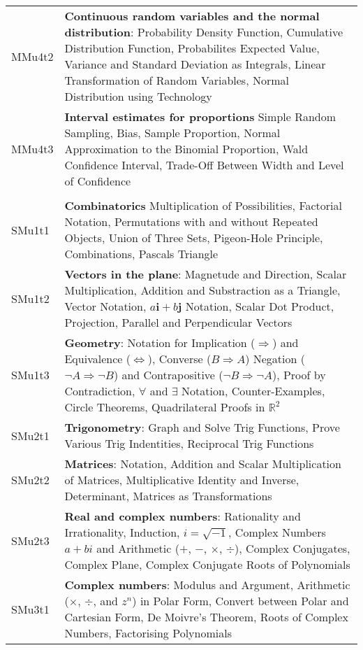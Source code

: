 \documentclass[varwidth=144mm, 12pt]{standalone}
\begin{document}
\begin{longtable}{lp{}}
MMu4t2 & \textbf{Continuous random variables and the normal distribution}: Probability Density Function, Cumulative Distribution Function, Probabilites Expected Value, Variance and Standard Deviation as Integrals, Linear Transformation of Random Variables, Normal Distribution using Technology \\
MMu4t3 & \textbf{Interval estimates for proportions} Simple Random Sampling, Bias, Sample Proportion, Normal Approximation to the Binomial Proportion, Wald Confidence Interval, Trade-Off Between Width and Level of Confidence \\
& \\
SMu1t1 & \textbf{Combinatorics} Multiplication of Possibilities, Factorial Notation, Permutations with and without Repeated Objects, Union of Three Sets, Pigeon-Hole Principle, Combinations, Pascals Triangle \\
SMu1t2 & \textbf{Vectors in the plane}: Magnetude and Direction, Scalar Multiplication, Addition and Substraction as a Triangle, Vector Notation, $a\textbf{i} + b\textbf{j}$ Notation, Scalar Dot Product, Projection, Parallel and Perpendicular Vectors \\
SMu1t3 & \textbf{Geometry}: Notation for Implication ($\Rightarrow$) and Equivalence ($\Leftrightarrow$), Converse ($B \Rightarrow A$) Negation ($\neg A \Rightarrow \neg B$) and Contrapositive ($\neg B \Rightarrow \neg A$), Proof by Contradiction, $\forall$ and $\exists$ Notation, Counter-Examples, Circle Theorems, Quadrilateral Proofs in $\mathbb{R}^2$ \\
SMu2t1 & \textbf{Trigonometry}: Graph and Solve Trig Functions, Prove Various Trig Indentities, Reciprocal Trig Functions \\
SMu2t2 & \textbf{Matrices}: Notation, Addition and Scalar Multiplication of Matrices, Multiplicative Identity and Inverse, Determinant, Matrices as Transformations \\
SMu2t3 & \textbf{Real and complex numbers}: Rationality and Irrationality, Induction, $i = \sqrt{-1}$, Complex Numbers $a + bi$ and Arithmetic ($+$, $-$, $\times$, $\div$), Complex Conjugates, Complex Plane,  Complex Conjugate Roots of Polynomials \\
SMu3t1 & \textbf{Complex numbers}: Modulus and Argument, Arithmetic ($\times$, $\div$, and $z^n$) in Polar Form, Convert between Polar and Cartesian Form, De Moivre's Theorem, Roots of Complex Numbers, Factorising Polynomials \\

\end{longtable}
\end{document}

